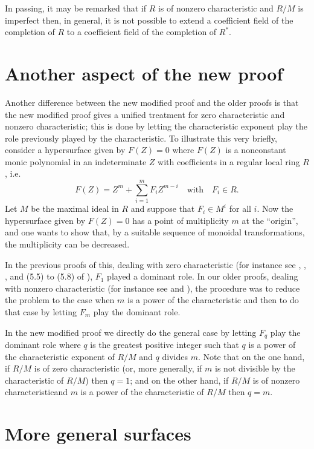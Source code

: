 In passing, it may be remarked that if $R$ is of nonzero characteristic and $R/M$ is imperfect then, in general, it is not possible to extend a coefficient field of the completion of $R$ to a coefficient field of the completion of $R^{*}$.

\section{Another aspect of the new proof}\label{art01-sec4}

Another difference between the new modified proof and the older proofs is that the new modified proof gives a unified treatment for zero characteristic and nonzero characteristic; this is done by letting the characteristic exponent play the role previously played by the characteristic. To illustrate this very briefly, consider a hypersurface given by $F(Z)=0$ where $F(Z)$ is a nonconstant monic polynomial in an indeterminate $Z$ with coefficients in a regular local ring $R$, i.e.
$$
F(Z)=Z^{m}+\sum\limits^{m}_{i=1}F_{i}Z^{m-i}\quad\text{with}\quad F_{i}\in R.
$$
Let $M$ be the maximal ideal in $R$ and suppose that $F_{i}\in M^{i}$ for all $i$. Now the hypersurface given by $F(Z)=0$ has a point of multiplicity $m$ at the ``origin'', and one wants to show that, by a suitable sequence of monoidal transformations, the multiplicity can be decreased.

In the previous proofs of this, dealing with zero characteristic (for instance see \cite{art01-key16}, \cite{art01-key18}, \cite{art01-key12}, and (5.5) to (5.8) of \cite{art01-key10}), $F_{1}$ played a dominant role. In our older proofs, dealing with nonzero characteristic (for instance see \cite{art01-key9} and \cite{art01-key11}), the procedure was to reduce the problem to the case when $m$ is a power of the characteristic and then to do that case by letting $F_{m}$ play the dominant role.

In the new modified proof we directly do the general case by letting $F_{q}$ play the dominant role where $q$ is the greatest positive integer such that $q$ is a power of the characteristic exponent of $R/M$ and $q$ divides $m$. Note that on the one hand, if $R/M$ is of zero characteristic (or, more generally, if $m$ is not divisible by the characteristic of $R/M$) then $q=1$; and on the other hand, if $R/M$ is of nonzero characteristic\pageoriginale and $m$ is a power of the characteristic of $R/M$ then $q=m$.

\section{More general surfaces}\label{art01-sec5}


